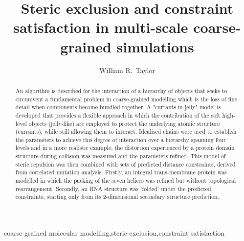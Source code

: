 \documentclass[review]{elsarticle}
\begin{document}
\begin{frontmatter}

\title{
Steric exclusion and constraint satisfaction in multi-scale coarse-grained simulations
}

\author{
William R.~Taylor
}
\address{
Francis Crick Institute, 1 Midland Rd., London NW1 1AT, UK
}

\begin{abstract}
An algorithm is described for the interaction of a hierarchy of objects that seeks to circumvent a fundamental problem in coarse-grained modelling which is the loss of fine detail when components become bundled together. A "currants-in-jelly" model is developed that provides a flexible approach in which the contribution of the soft high-level objects (jelly-like) are employed to protect the underlying atomic structure (currants), while still allowing them to interact. Idealised chains were used to establish the parameters to achieve this degree of interaction over a hierarchy spanning four levels and in a more realistic example, the distortion experienced by a protein domain structure during collision was measured and the parameters refined. This model of steric repulsion was then combined with sets of predicted distance constraints, derived from correlated mutation analysis. Firstly, an integral trans-membrane protein was modelled in which the packing of the seven helices was refined but without topological rearrangement. Secondly, an RNA structure was 'folded' under the predicted constraints, starting only from its 2-dimensional secondary structure prediction. 
\end{abstract}

\begin{keyword}
coarse-grained molecular modelling\sep steric-exclusion\sep constraint satisfaction
\end{keyword}

\end{frontmatter}

\linenumbers

%
%
%
%
%
%
%
\end{document}
